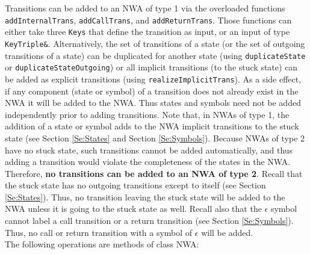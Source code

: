 \documentclass{llncs}
\begin{document}
Transitions can be added to an NWA of type 1 via the overloaded functions \texttt{addInternalTrans}, \texttt{addCallTrans}, and \texttt{addReturnTrans}.  Those functions can either take three \texttt{Keys} that define the transition as input, or an input of type \texttt{KeyTriple\&}.  Alternatively, the set of transitions of a state (or the set of outgoing transitions of a state) can be duplicated for another state (using \texttt{duplicateState} or \texttt{duplicateStateOutgoing}) or all implicit transitions (to the stuck state) can be added as explicit transitions (using \texttt{realizeImplicitTrans}).  As a side effect, if any component (state or symbol) of a transition does not already exist in the NWA it will be added to the NWA.  Thus states and symbols need not be added independently prior to adding transitions.  Note that, in NWAs of type 1, the addition of a state or symbol adds to the NWA implicit transitions to the stuck state (see Section \ref{Se:States} and Section \ref{Se:Symbols}).  Because NWAs of type 2 have no stuck state, such transitions cannot be added automatically, and thus adding a transition would violate the completeness of the states in the NWA.  Therefore, \textbf{no transitions can be added to an NWA of type 2}.  Recall that the stuck state has no outgoing transitions except to itself (see Section \ref{Se:States}).  Thus, no transition leaving the stuck state will be added to the NWA unless it is going to the stuck state as well.  Recall also that the \texttt{$\epsilon$} symbol cannot label a call transition or a return transition (see Section \ref{Se:Symbols}).  Thus, no call or return transition with a symbol of \texttt{$\epsilon$} will be added. \\

\noindent The following operations are methods of class NWA:
\end{document}

